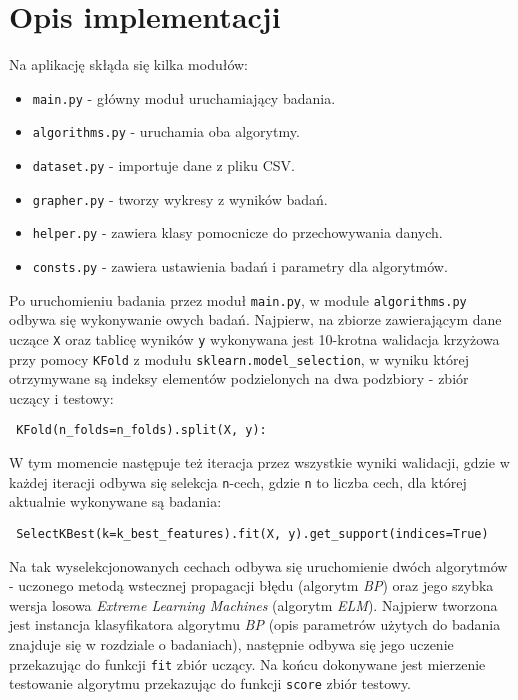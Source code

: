 \newpage

\section{Opis implementacji}

Na aplikację skłąda się kilka modułów:

\begin{itemize}
    \item \texttt{main.py} - główny moduł uruchamiający badania.
    \item \texttt{algorithms.py} - uruchamia oba algorytmy.
    \item \texttt{dataset.py} - importuje dane z pliku CSV.
    \item \texttt{grapher.py} - tworzy wykresy z wyników badań.
    \item \texttt{helper.py} - zawiera klasy pomocnicze do przechowywania danych.
    \item \texttt{consts.py} - zawiera ustawienia badań i parametry dla algorytmów.
\end{itemize}

Po uruchomieniu badania przez moduł \texttt{main.py}, w module \texttt{algorithms.py} odbywa się wykonywanie owych badań. Najpierw, na zbiorze zawierającym dane uczące \texttt{X} oraz tablicę wyników \texttt{y} wykonywana jest 10-krotna walidacja krzyżowa przy pomocy \texttt{KFold} z modułu \texttt{sklearn.model\_selection}, w wyniku której otrzymywane są indeksy elementów podzielonych na dwa podzbiory - zbiór uczący i testowy:

\begin{verbatim}
 KFold(n_folds=n_folds).split(X, y):
\end{verbatim}

W tym momencie następuje też iteracja przez wszystkie wyniki walidacji, gdzie w każdej iteracji odbywa się selekcja \texttt{n}-cech, gdzie \texttt{n} to liczba cech, dla której aktualnie wykonywane są badania:

\begin{verbatim}
 SelectKBest(k=k_best_features).fit(X, y).get_support(indices=True)
\end{verbatim}

Na tak wyselekcjonowanych cechach odbywa się uruchomienie dwóch algorytmów - uczonego metodą wstecznej propagacji błędu (algorytm \textit{BP}) oraz jego szybka wersja losowa \textit{Extreme Learning Machines} (algorytm \textit{ELM}). Najpierw tworzona jest instancja klasyfikatora algorytmu \textit{BP} (opis parametrów użytych do badania znajduje się w rozdziale o badaniach), następnie odbywa się jego uczenie przekazując do funkcji \texttt{fit} zbiór uczący. Na końcu dokonywane jest mierzenie testowanie algorytmu przekazując do funkcji \texttt{score} zbiór testowy.

